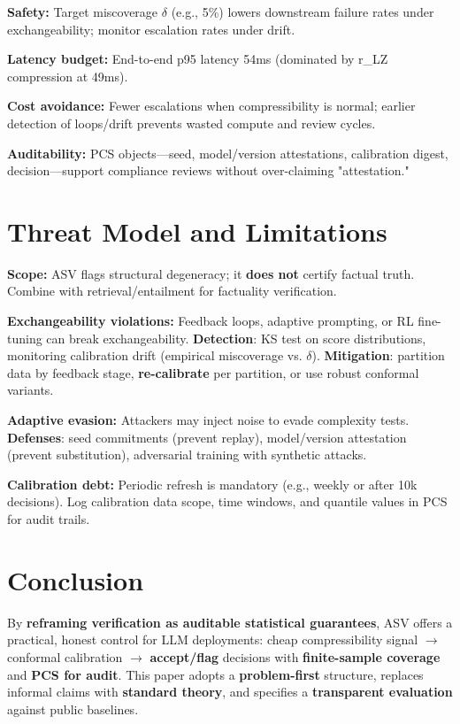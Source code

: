 \documentclass[11pt]{article}
\begin{document}
\textbf{Safety:} Target miscoverage $\delta$ (e.g., 5\%) lowers downstream failure rates under exchangeability; monitor escalation rates under drift.

\textbf{Latency budget:} End-to-end p95 latency 54ms (dominated by r_LZ compression at 49ms).

\textbf{Cost avoidance:} Fewer escalations when compressibility is normal; earlier detection of loops/drift prevents wasted compute and review cycles.

\textbf{Auditability:} PCS objects---seed, model/version attestations, calibration digest, decision---support compliance reviews without over-claiming "attestation."

\section{Threat Model and Limitations}
\label{sec:limitations}

\textbf{Scope:} ASV flags structural degeneracy; it \textbf{does not} certify factual truth. Combine with retrieval/entailment for factuality verification.

\textbf{Exchangeability violations:} Feedback loops, adaptive prompting, or RL fine-tuning can break exchangeability. \textbf{Detection}: KS test on score distributions, monitoring calibration drift (empirical miscoverage vs. $\delta$). \textbf{Mitigation}: partition data by feedback stage, \textbf{re-calibrate} per partition, or use robust conformal variants.

\textbf{Adaptive evasion:} Attackers may inject noise to evade complexity tests. \textbf{Defenses}: seed commitments (prevent replay), model/version attestation (prevent substitution), adversarial training with synthetic attacks.

\textbf{Calibration debt:} Periodic refresh is mandatory (e.g., weekly or after 10k decisions). Log calibration data scope, time windows, and quantile values in PCS for audit trails.

\section{Conclusion}
\label{sec:conclusion}

By \textbf{reframing verification as auditable statistical guarantees}, ASV offers a practical, honest control for LLM deployments: cheap compressibility signal $\rightarrow$ conformal calibration $\rightarrow$ \textbf{accept/flag} decisions with \textbf{finite-sample coverage} and \textbf{PCS for audit}. This paper adopts a \textbf{problem-first} structure, replaces informal claims with \textbf{standard theory}, and specifies a \textbf{transparent evaluation} against public baselines.
\end{document}
